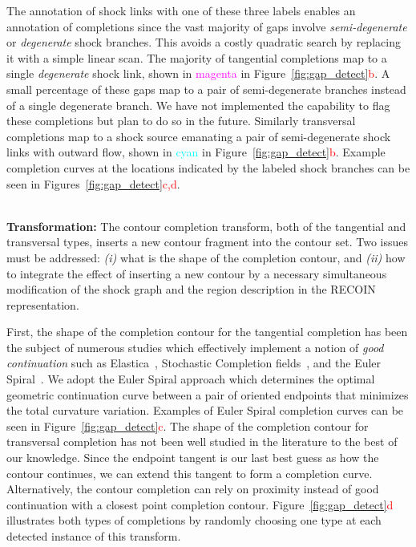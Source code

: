 The annotation of shock links with one of these three labels enables an annotation of completions since the vast majority of gaps involve \emph{semi-degenerate} or \emph{degenerate} shock branches. This avoids a costly quadratic search by replacing it with a simple linear scan. The majority of tangential completions map to a single \emph{degenerate} shock link, shown in \textcolor{magenta}{magenta} in  Figure~\ref{fig:gap_detect}\textcolor{red}{b}. A small percentage of these gaps map to a pair of semi-degenerate branches instead of a single degenerate branch. We have not implemented the capability to flag these completions but plan to do so in the future. Similarly transversal completions map to a shock source emanating a pair of semi-degenerate shock links with outward flow, shown in \textcolor{cyan}{cyan} in  Figure~\ref{fig:gap_detect}\textcolor{red}{b}. Example completion curves at the locations indicated by the labeled shock branches can be seen in Figures~\ref{fig:gap_detect}\textcolor{red}{c,d}.


\noindent\\
{\bf Transformation:} The contour completion transform, both of the tangential and transversal types, inserts a new contour fragment into the contour set. Two issues must be addressed: \emph{(i)} what is the shape of the completion contour, and \emph{(ii)} how to integrate the effect of inserting a new contour by a necessary simultaneous modification of the shock graph and the region description in the RECOIN representation.

First, the shape of the completion contour for the tangential completion has been the subject of numerous studies which effectively implement a notion of \emph{good continuation} such as Elastica~\cite{Mumford:Elastic:1994}, Stochastic Completion fields~\cite{Williams:Jacobs:NC95}, and the Euler Spiral~\cite{Kimia:Euler:Spiral:IJCV03}. We adopt the Euler Spiral approach which determines the optimal geometric continuation curve between a pair of oriented endpoints that minimizes the total curvature variation. Examples of Euler Spiral completion curves can be seen in Figure~\ref{fig:gap_detect}\textcolor{red}{c}. The shape of the completion contour for transversal completion has not been well studied in the literature to the best of our knowledge. Since the endpoint tangent is our last best guess as how the contour continues, we can extend this tangent to form a completion curve. Alternatively, the contour completion can rely on proximity instead of good continuation with a closest point completion contour. Figure~\ref{fig:gap_detect}\textcolor{red}{d} illustrates both types of completions by randomly choosing one type at each detected instance of this transform. 

